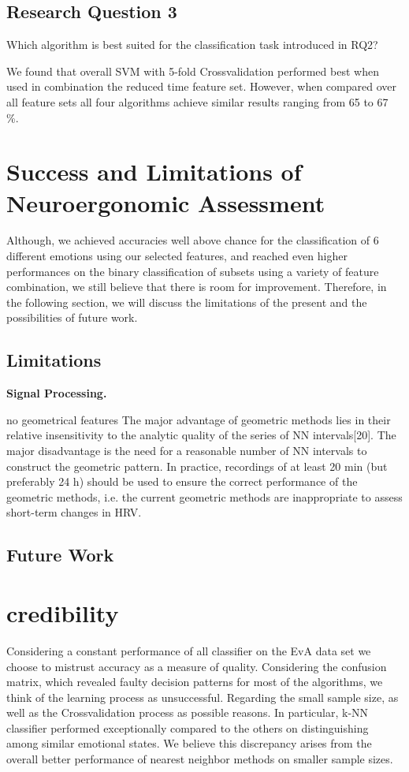 \subsection{Research Question 3}  
Which algorithm is best suited for the classification task introduced in RQ2?

We found that overall SVM with 5-fold Crossvalidation performed best when used in combination the reduced time feature set. However, when compared over all feature sets all four algorithms achieve similar results ranging from 65 to 67 \%.

\section{Success and Limitations of Neuroergonomic Assessment}
Although, we achieved accuracies well above chance for the classification of 6 different emotions using our selected features, and reached even higher performances on the binary classification of subsets using a variety of feature combination, we still believe that there is room for improvement. Therefore, in the following section, we will discuss the limitations of the present and the possibilities of future work.

\subsection{Limitations}
\textbf{Signal Processing.}

no geometrical features 
The major advantage of geometric methods lies
in their relative insensitivity to the analytic quality of
the series of NN intervals[20]. The major disadvantage is
the need for a reasonable number of NN intervals to
construct the geometric pattern. In practice, recordings
of at least 20 min (but preferably 24 h) should be used
to ensure the correct performance of the geometric
methods, i.e. the current geometric methods are inappropriate
to assess short-term changes in HRV.
\subsection{Future Work}

\section{credibility}
Considering a constant performance of all classifier on the EvA data set we choose to mistrust accuracy as a measure of quality. Considering the confusion matrix, which revealed faulty decision patterns for most of the algorithms, we think of the learning process as unsuccessful. Regarding the small sample size, as well as the Crossvalidation process as possible reasons.
In particular, k-NN classifier performed exceptionally compared to the others on distinguishing among similar emotional states. We believe this discrepancy arises from the overall better performance of nearest neighbor methods on smaller sample sizes.
